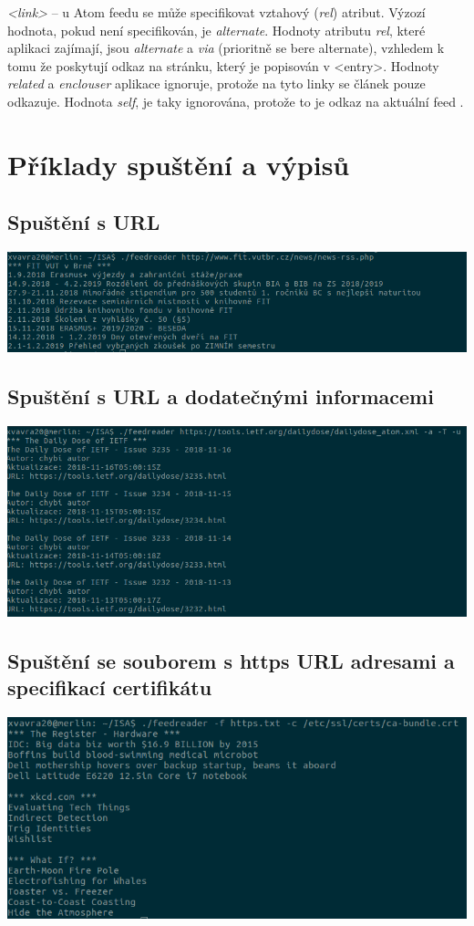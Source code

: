 \documentclass[11pt] {article}
\begin{document}
\emph{<link>} -- u Atom feedu se může specifikovat vztahový (\emph{rel}) atribut. Výzozí hodnota, pokud není specifikován, je \emph{alternate}. Hodnoty atributu \emph{rel}, které aplikaci zajímají, jsou \emph{alternate} a \emph{via} (prioritně se bere alternate), vzhledem k tomu že poskytují odkaz na stránku, který je popisován v <entry>. Hodnoty \emph{related} a \emph{enclouser} aplikace ignoruje, protože na tyto linky se článek pouze odkazuje. Hodnota \emph{self}, je taky ignorována, protože to je odkaz na aktuální feed \cite{Atom}.

\section{Příklady spuštění a výpisů}
\subsection{Spuštění s URL}
\includegraphics[scale=0.6]{feedreader1.png}
\subsection{Spuštění s URL a dodatečnými informacemi}
\includegraphics[scale=0.6]{feedreader2.png}
\subsection{Spuštění se souborem s https URL adresami a specifikací certifikátu}
\includegraphics[scale=0.6]{feedreader3.png}
\end{document}
